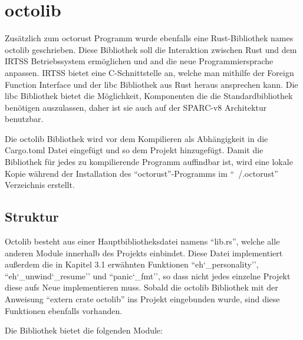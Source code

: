 \section{octolib}

Zusätzlich zum octorust Programm wurde ebenfalls eine Rust-Bibliothek names octolib geschrieben. Diese Bibliothek soll
die Interaktion zwischen Rust und dem IRTSS Betriebssystem ermöglichen und and die neue Programmiersprache anpassen. IRTSS
bietet eine C-Schnittstelle an, welche man mithilfe der Foreign Function Interface und der libc Bibliothek aus Rust heraus ansprechen
kann. Die libc Bibliothek bietet die Möglichkeit, Komponenten die die Standardbibliothek benötigen auszulassen, daher ist sie
auch auf der SPARC-v8 Architektur benutzbar.

Die octolib Bibliothek wird vor dem Kompilieren als Abhängigkeit in die Cargo.toml Datei eingefügt und so dem Projekt hinzugefügt.
Damit die Bibliothek für jedes zu kompilierende Programm auffindbar ist, wird eine lokale Kopie während der Installation des
``octorust''-Programms im ``~/.octorust'' Verzeichnis erstellt.

\subsection{Struktur}

Octolib besteht aus einer Hauptbibliotheksdatei namens ``lib.rs'', welche alle anderen Module innerhalb des Projekts einbindet. Diese
Datei implementiert außerdem die in Kapitel 3.1 erwähnten Funktionen ``eh\char`_personality'', ``eh\char`_unwind\char`_resume'' und
``panic\char`_fmt'', so dass nicht jedes einzelne Projekt diese aufs Neue implementieren muss. Sobald die octolib Bibliothek
mit der Anweisung ``extern crate octolib'' ins Projekt eingebunden wurde, sind diese Funktionen ebenfalls vorhanden.

Die Bibliothek bietet die folgenden Module:

